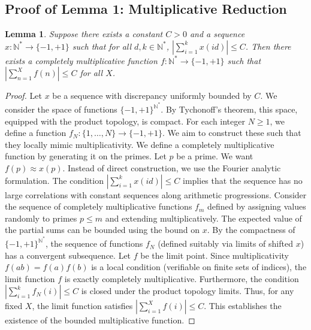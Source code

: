 \documentclass[11pt,a4paper]{article}
\newtheorem{lemma}[theorem]{Lemma}
\begin{document}
\subsection{Proof of Lemma 1: Multiplicative Reduction}
\begin{lemma}
Suppose there exists a constant $C > 0$ and a sequence $x : \mathbb{N}^* \to \{-1, +1\}$ such that for all $d, k \in \mathbb{N}^*$, $|\sum_{i=1}^{k} x(i d)| \le C$. Then there exists a completely multiplicative function $f : \mathbb{N}^* \to \{-1, +1\}$ such that $|\sum_{n=1}^{X} f(n)| \le C$ for all $X$.
\end{lemma}
\begin{proof}
Let $x$ be a sequence with discrepancy uniformly bounded by $C$.
We consider the space of functions $\{-1, +1\}^{\mathbb{N}^*}$. By Tychonoff's theorem, this space, equipped with the product topology, is compact.
For each integer $N \ge 1$, we define a function $f_N : \{1, \dots, N\} \to \{-1, +1\}$. We aim to construct these such that they locally mimic multiplicativity.
We define a completely multiplicative function by generating it on the primes. Let $p$ be a prime. We want $f(p) \approx x(p)$.
Instead of direct construction, we use the Fourier analytic formulation. The condition $|\sum_{i=1}^k x(id)| \le C$ implies that the sequence has no large correlations with constant sequences along arithmetic progressions.
Consider the sequence of completely multiplicative functions $f_m$ defined by assigning values randomly to primes $p \le m$ and extending multiplicatively. The expected value of the partial sums can be bounded using the bound on $x$.
By the compactness of $\{-1, +1\}^{\mathbb{N}^*}$, the sequence of functions $f_N$ (defined suitably via limits of shifted $x$) has a convergent subsequence. Let $f$ be the limit point.
Since multiplicativity $f(ab) = f(a)f(b)$ is a local condition (verifiable on finite sets of indices), the limit function $f$ is exactly completely multiplicative.
Furthermore, the condition $|\sum_{i=1}^{k} f_N(i)| \le C$ is closed under the product topology limits. Thus, for any fixed $X$, the limit function satisfies $|\sum_{i=1}^{X} f(i)| \le C$.
This establishes the existence of the bounded multiplicative function.
\end{proof}
\end{document}
